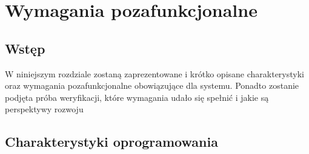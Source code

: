 \chapter{Wymagania pozafunkcjonalne}
\label{Chapter4}

\section{Wstęp}
\label{Chapter41}

W niniejszym rozdziale zostaną zaprezentowane i krótko opisane charakterystyki oraz wymagania pozafunkcjonalne obowiązujące dla systemu. Ponadto zostanie podjęta próba weryfikacji, które wymagania udało się spełnić i jakie są perspektywy rozwoju

\section{Charakterystyki oprogramowania}
%
%
%
%
